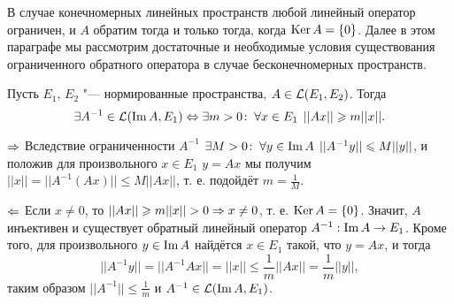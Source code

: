 \documentclass[main]{subfiles}
\begin{document}
В случае конечномерных линейных пространств
любой линейный оператор ограничен,
и \( A \) обратим тогда и только тогда,
когда \( \operatorname{Ker} A = \{ 0 \} \).
Далее в этом параграфе мы рассмотрим
достаточные и необходимые условия
существования ограниченного обратного оператора
в случае бесконечномерных пространств.

\begin{theorem}
  Пусть \( E_1 \), \( E_2 \) "---
  нормированные пространства,
  \( A \in \Linears{E_1}[E_2] \).
  Тогда
  \[
    \exists A^{-1} \in \Linears{\Img A}[E_1] \oTTo
    \Exists{m > 0} \Forall{x \in E_1} ||Ax|| \ge m ||x||.
  \]
\end{theorem}
\begin{itemproof}
\item [\( \Rightarrow \)]
  Вследствие ограниченности \( A^{-1} \)
  \( \exists M > 0 \colon \: \forall {y \in \operatorname{Im}A} \; \, ||A^{-1} y|| \leqslant M||y|| \),
  и положив для произвольного \( x \in E_1 \) \( y = Ax \)
  мы получим \( ||x|| = ||A^{-1} (A x)|| \le M ||Ax|| \),
  т. е. подойдёт \( m = \frac{1}{M} \).
\item[\( \Leftarrow \)] %
  Если \( x \ne 0 \), то \( ||Ax|| \geqslant m ||x|| > 0 \Rightarrow x \ne 0 \),
  т. е. \( \operatorname{Ker} A = \{ 0 \} \).
  Значит, \( A \) инъективен и существует
  обратный линейный оператор \( A^{-1} : \operatorname{Im} A \to E_1 \).
  Кроме того, для произвольного \( y \in \operatorname{Im} A \)
  найдётся \( x \in E_1 \) такой, что \( y = Ax \),
  и тогда
  \[
    ||A^{-1} y|| = ||A^{-1} A x|| = ||x|| \le
    \frac{1}{m} ||Ax|| = \frac1m ||y||,
  \]
  таким образом \( ||A^{-1}|| \le \frac{1}{m} \)
  и \( A^{-1} \in \Linears{\Img A}[E_1] \).
\end{itemproof}
\end{document}
